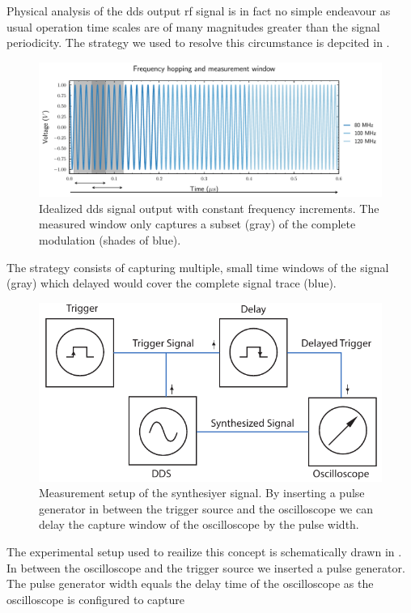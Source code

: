 Physical analysis of the \gls{dds} output \gls{rf} signal is in fact no simple
endeavour as usual operation time scales are of many magnitudes greater than
the signal periodicity. The strategy we used to resolve this circumstance is
depcited in .
\begin{figure}[htb]
  \centering
  \includegraphics[width=\textwidth]{../figure/signal/window.pdf}
  \caption{Idealized \gls{dds} signal output with constant frequency
    increments. The measured window only captures a subset (gray) of the complete
    modulation (shades of blue).}\label{fig:signal_window}
\end{figure}
The strategy consists of capturing multiple, small time windows of the signal
(gray) which delayed would cover the complete signal trace (blue).
\begin{figure}[htb]
  \centering
  \includegraphics[width=.8\textwidth]{../figure/signal/setup-dds.pdf}
  \caption{Measurement setup of the synthesiyer signal. By inserting a pulse
    generator in between the trigger source and the oscilloscope we can delay
    the capture window of the oscilloscope by the pulse width.
  }\label{fig:signal_window_setup}
\end{figure}
The experimental setup used to reailize this concept is schematically drawn in
. In between the oscilloscope and the trigger
source we inserted a pulse generator. The pulse generator width equals the
delay time of the oscilloscope as the oscilloscope is configured to capture

